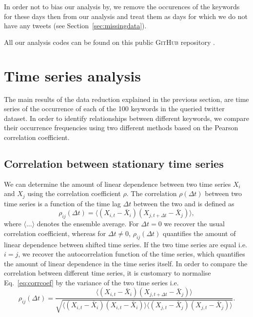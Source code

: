 \documentclass[12pt, a4paper]{article}
\begin{document}
In order not to bias our analysis by, we remove the occurences of the keywords for these days then from our analysis and treat them as days for which we do not have any tweets (see Section~\ref{sec:missingdata}).

All our analysis codes can be found on this public \textsc{GitHub} repository \cite{github}.

\section{Time series analysis}
The main results of the data reduction explained in the previous section, are time series of the occurrence of each of the 100 keywords in the queried twitter dataset. In order to identify relationships between different keywords, we compare their occurrence frequencies using two different methods based on the Pearson correlation coefficient. 

\subsection{Correlation between stationary time series}
We can determine the amount of linear dependence between two time series $X_{i}$ and $X_{j}$ using the correlation coefficient $\rho$. The correlation $\rho(\Delta t)$ between two time series is a function of the time lag $\Delta t$ between the two and is defined as \cite{dettling14}
\begin{equation}
\rho_{ij}(\Delta t) = \langle (X_{i, t}-\bar{X}_{i}) (X_{j, t+\Delta t}-\bar{X}_{j}) \rangle, \label{eq:corrcoef}
\end{equation} 
where $\langle ... \rangle$ denotes the ensemble average. For $\Delta t = 0$ we recover the usual correlation coefficient, whereas for $\Delta t \neq 0$, $\rho_{ij}(\Delta t)$ quantifies the amount of linear dependence between shifted time series. If the two time series are equal i.e. $i = j$, we recover the autocorrelation function of the time series, which quantifies the amount of linear dependence in the time series itself. In order to compare the correlation between different time series, it is customary to normalise Eq.~\ref{eq:corrcoef} by the variance of the two time series i.e. \cite{dettling14}
\begin{equation}
\rho_{ij}(\Delta t) = \frac{\langle (X_{i, t}-\bar{X}_{i}) (X_{j, t+\Delta t}-\bar{X}_{j}) \rangle}{\sqrt{\langle (X_{i, t}-\bar{X}_{i}) (X_{i, t}-\bar{X}_{i}) \rangle \langle (X_{j, t}-\bar{X}_{j}) (X_{j, t}-\bar{X}_{j}) \rangle}}. \label{eq:corrcoef1}
\end{equation} 
\end{document}
